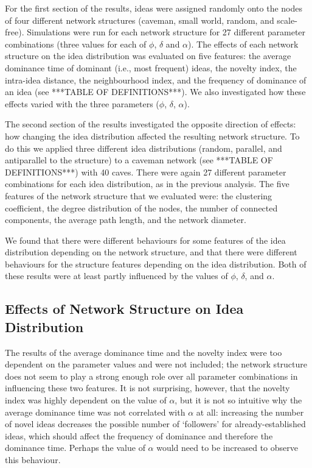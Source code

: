

For the first section of the results, ideas were assigned randomly onto the nodes of four different network structures (caveman, small world, random, and scale-free). Simulations were run for each network structure for 27 different parameter combinations (three values for each of $\phi$, $\delta$ and $\alpha$). The effects of each network structure on the idea distribution was evaluated on five features: the average dominance time of dominant (i.e., most frequent) ideas, the novelty index, the intra-idea distance, the neighbourhood index, and the frequency of dominance of an idea (see ***TABLE OF DEFINITIONS***). We also investigated how these effects varied with the three parameters ($\phi$, $\delta$, $\alpha$).

The second section of the results investigated the opposite direction of effects: how changing the idea distribution affected the resulting network structure. To do this we applied three different idea distributions (random, parallel, and antiparallel to the structure) to a caveman network (see ***TABLE OF DEFINITIONS***) with 40 caves. There were again 27 different parameter combinations for each idea distribution, as in the previous analysis. The five features of the network structure that we evaluated were: the clustering coefficient, the degree distribution of the nodes, the number of connected components, the average path length, and the network diameter. 

We found that there were different behaviours for some features of the idea distribution depending on the network structure, and that there were different behaviours for the structure features depending on the idea distribution. Both of these results were at least partly influenced by the values of $\phi$, $\delta$, and $\alpha$.

\subsection{Effects of Network Structure on Idea Distribution}

The results of the average dominance time and the novelty index were too dependent on the parameter values and were not included; the network structure does not seem to play a strong enough role over all parameter combinations in influencing these two features. It is not surprising, however, that the novelty index was highly dependent on the value of $\alpha$, but it is not so intuitive why the average dominance time was not correlated with $\alpha$ at all: increasing the number of novel ideas decreases the possible number of `followers' for already-established ideas, which should affect the frequency of dominance and therefore the dominance time. Perhaps the value of $\alpha$ would need to be increased to observe this behaviour.

